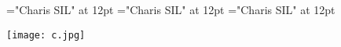 \documentclass[a4paper]{article}
\begin{document}
\pagestyle{plain}
\sloppy
\setlength{\parfillskip}{0pt plus 1fil}
\font\entrydicBody="Charis SIL" at 12pt
\font\pictureRightentrydicBody="Charis SIL" at 12pt
\font\picturepictureRightentrydicBody="Charis SIL" at 12pt

\pagestyle{fancy} 


\begin{wrapfigure}
\begin{center}
\texttt{[image: c.jpg]} 
\caption{}
\end{center}
\end{wrapfigure}
\end{document}
